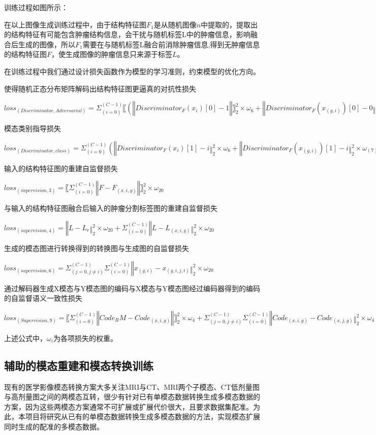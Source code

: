 \documentclass[letterpaper]{article} %
\begin{document}
训练过程如图所示：

在以上图像生成训练过程中，由于结构特征图$F_1$是从随机图像$n$中提取的，提取出的结构特征有可能包含肿瘤结构信息，会干扰与随机标签L中的肿瘤信息，影响融合后生成的图像，所以$F_1$需要在与随机标签L融合前消除肿瘤信息,得到无肿瘤信息的结构特征图$F$，使生成图像的肿瘤信息只来源于标签$L$。

在训练过程中我们通过设计损失函数作为模型的学习准则，约束模型的优化方向。

使得随机正态分布矩阵解码出结构特征图更逼真的对抗性损失

$loss_(Discriminator,Adversarial )=Σ_(i=0)^(C-1) 〖(‖Discriminator_F (x_i )[0]-1‖〗_2^2×ω_6+‖Discriminator_F (x_(g,i) )[0]-0‖_2^2×ω_7)
loss_(Generator,Adversarial )=Σ_(i=0)^(C-1) ‖Discriminator_F (x_(g,i) )[0]-1‖_2^2×ω_8$

模态类别指导损失

$loss_(Discriminator,class )=Σ_(i=0)^(C-1) (‖Discriminator_F (x_i )[1]-i‖_2^2×ω_6+‖Discriminator_F (x_(g,i) )[1]-i‖_2^2×ω_(7))
loss_(Generator,class)==Σ_(i=0)^(C-1) ‖Discriminator_F (x_(g,i) )[1]-i‖_2^2×ω_8$

输入的结构特征图的重建自监督损失

$loss_(supervision,3)=〖Σ_(i=0)^(C-1) ‖F-F_(x,i,g) ‖〗_2^2×ω_20$

与输入的结构特征图融合后输入的肿瘤分割标签图的重建自监督损失

$loss_(supervision,4)=‖L-L_r ‖_2^2×ω_20+Σ_(i=0)^(C-1) ‖L-L_(x,i,g) ‖_2^2×ω_20$

生成的模态图进行转换得到的转换图与生成图的自监督损失

$loss_(supervision,6)=Σ_(j=0,j≠i)^(C-1) Σ_(i=0)^(C-1) ‖x_(g,i)-x_(g,i,j,t) ‖_2^2×ω_20$

通过解码器生成X模态与Y模态图的编码与X模态与Y模态图经过编码器得到的编码的自监督语义一致性损失

$loss_(Supervision,9)=〖Σ_(i=0)^(C-1) ‖Code_RM-Code_(x,i,g) ‖〗_2^2×ω_4+ Σ_(j=0,j≠i)^(C-1) Σ_(i=0)^(C-1) ‖Code_(x,i,g)-Code_(x,j,g) ‖_2^2×ω_4$

上述公式中，$ω_i$为各项损失的权重。

\subsection{辅助的模态重建和模态转换训练}
现有的医学影像模态转换方案大多关注MRI与CT、MRI两个子模态、CT低剂量图与高剂量图之间的两模态互转，很少有针对已有单模态数据转换生成多模态数据的方案，因为这些两模态方案通常不可扩展或扩展代价很大，且要求数据集配准。为此，本项目将研究从已有的单模态数据转换生成多模态数据的方法，实现模态扩展同时生成的配准的多模态数据。
\end{document}
